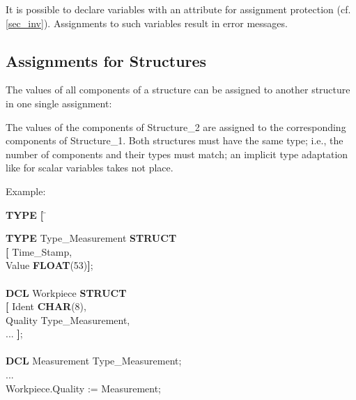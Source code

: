 It is possible to declare variables with an attribute for assignment
protection (cf.  \ref{sec_inv}). Assignments to such variables result in error
messages.

\subsection{Assignments for Structures}   %

The values of all components of a structure can be assigned to another
structure in one single assignment:



The values of the components of Structure\_2 are assigned to the
corresponding components of Structure\_1. Both structures must have the same
type; i.e., the number of components and their types must match; an
implicit type adaptation like for scalar variables takes not place.

Example:

\begin{tabbing}
{\bf TYPE} \= {\bf [} \= \kill

{\bf TYPE} \>         \> Type\_Measurement {\bf STRUCT}\\
    \> {\bf [} \> Time\_Stamp, \\
    \>         \> Value {\bf FLOAT}(53){\bf ]};\\
    \>         \> \\
{\bf DCL}  \>         \> Workpiece {\bf STRUCT} \\
    \> {\bf [} \> Ident {\bf CHAR}(8),\\
    \>         \> Quality Type\_Measurement,\\
    \>         \> ... {\bf ]};\\
    \>         \> \\
{\bf DCL}  \>         \> Measurement Type\_Measurement;\\
...        \>         \> \\
Workpiece.Quality := Measurement;
\end{tabbing}

